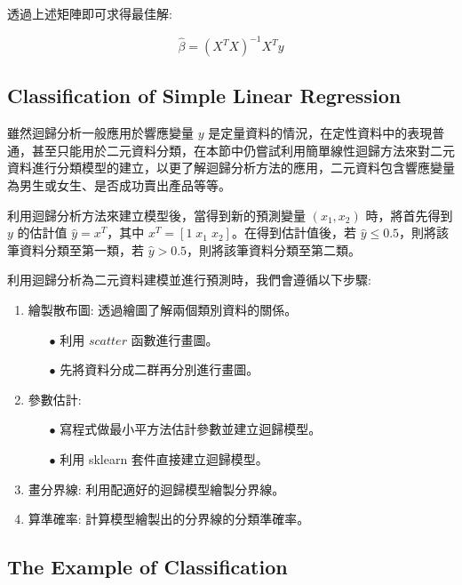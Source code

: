 透過上述矩陣即可求得最佳解:

\begin{equation}
\hat{\beta}=(X^{T}X)^{-1}X^{T}y
\end{equation}


\subsection{Classification of Simple Linear Regression}

雖然迴歸分析一般應用於響應變量 $y$ 是定量資料的情況，在定性資料中的表現普通，甚至只能用於二元資料分類，在本節中仍嘗試利用簡單線性迴歸方法來對二元資料進行分類模型的建立，以更了解迴歸分析方法的應用，二元資料包含響應變量為男生或女生、是否成功賣出產品等等。

利用迴歸分析方法來建立模型後，當得到新的預測變量 $(x_1, x_2)$ 時，將首先得到 $y$ 的估計值 $\hat{y}=x^{T}$，其中 $x^{T}=\left[1 \; x_1 \; x_2 \right]$。在得到估計值後，若 $\hat{y} \leq 0.5$，則將該筆資料分類至第一類，若 $\hat{y} > 0.5$，則將該筆資料分類至第二類。

利用迴歸分析為二元資料建模並進行預測時，我們會遵循以下步驟:

\begin{enumerate}
\item{} 繪製散布圖: 透過繪圖了解兩個類別資料的關係。
\begin{itemize}
\item[$\bullet$] 利用 $scatter$ 函數進行畫圖。
\item[$\bullet$] 先將資料分成二群再分別進行畫圖。
\end{itemize}

\item{} 參數估計: 
\begin{itemize}
\item[$\bullet$] 寫程式做最小平方法估計參數並建立迴歸模型。
\item[$\bullet$] 利用 sklearn 套件直接建立迴歸模型。
\end{itemize}

\item{} 畫分界線: 利用配適好的迴歸模型繪製分界線。

\item{} 算準確率: 計算模型繪製出的分界線的分類準確率。

\end{enumerate}

\subsection{The Example of Classification}

